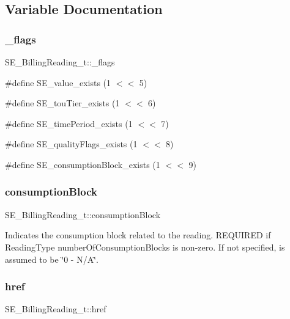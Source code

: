 \subsection{Variable Documentation}
\mbox{\label{group__BillingReading_ga347586ffe6481f13ef2a86ae5c2802f1}} 
\subsubsection{\texorpdfstring{\+\_\+flags}{\_flags}}
{\footnotesize\ttfamily S\+E\+\_\+\+Billing\+Reading\+\_\+t\+::\+\_\+flags}

\#define S\+E\+\_\+value\+\_\+exists (1 $<$$<$ 5)

\#define S\+E\+\_\+tou\+Tier\+\_\+exists (1 $<$$<$ 6)

\#define S\+E\+\_\+time\+Period\+\_\+exists (1 $<$$<$ 7)

\#define S\+E\+\_\+quality\+Flags\+\_\+exists (1 $<$$<$ 8)

\#define S\+E\+\_\+consumption\+Block\+\_\+exists (1 $<$$<$ 9) \mbox{\label{group__BillingReading_gafcecb5b014f7cd87df8944a0c04c4205}} 
\subsubsection{\texorpdfstring{consumption\+Block}{consumptionBlock}}
{\footnotesize\ttfamily S\+E\+\_\+\+Billing\+Reading\+\_\+t\+::consumption\+Block}

Indicates the consumption block related to the reading. R\+E\+Q\+U\+I\+R\+ED if Reading\+Type number\+Of\+Consumption\+Blocks is non-\/zero. If not specified, is assumed to be \char`\"{}0 -\/ N/\+A\char`\"{}. \mbox{\label{group__BillingReading_gaefb40f15330576c4cf4dcdbf218648a1}} 
\subsubsection{\texorpdfstring{href}{href}}
{\footnotesize\ttfamily S\+E\+\_\+\+Billing\+Reading\+\_\+t\+::href}


